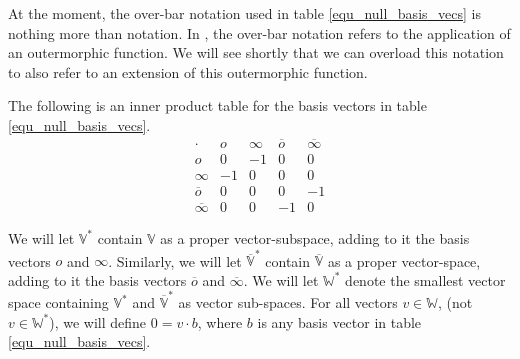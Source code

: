 \documentclass{birkjour}
\theoremstyle{definition}
\theoremstyle{remark}
\numberwithin{equation}{section}
\newcommand{\V}{\mathbb{V}}
\newcommand{\W}{\mathbb{W}}
\newcommand{\nvao}{o}
\newcommand{\nvai}{\infty}
\newcommand{\nvaob}{\overline{o}}
\newcommand{\nvaib}{\overline{\infty}}
\begin{document}
At the moment, the over-bar notation used in table \eqref{equ_null_basis_vecs}
is nothing more than notation.  In \cite{Parkin12}, the over-bar notation refers to the application
of an outermorphic function.  We will see shortly that we can overload this notation to
also refer to an extension of this outermorphic function.

The following is an inner product table for the basis vectors in table \eqref{equ_null_basis_vecs}.
\begin{equation}
\begin{array}{c|cccc}
\cdot & \nvao & \nvai & \nvaob & \nvaib \\
\hline
\nvao & 0 & -1 & 0 & 0 \\
\nvai & -1 & 0 & 0 & 0 \\
\nvaob & 0 & 0 & 0 & -1 \\
\nvaib & 0 & 0 & -1 & 0
\end{array}
\end{equation}

We will let $\V^*$ contain $\V$ as a proper vector-subspace, adding to it the
basis vectors $\nvao$ and $\nvai$.  Similarly, we will let $\overline{\V}^*$ contain
$\overline{\V}$ as a proper vector-space, adding to it the basis vectors $\overline{\nvao}$
and $\overline{\nvai}$.  We will let $\W^*$ denote the smallest vector space containing
$\V^*$ and $\overline{\V}^*$ as vector sub-spaces.
For all vectors $v\in\W$, (not $v\in\W^*$), we will define $0=v\cdot b$, where
$b$ is any basis vector in table \eqref{equ_null_basis_vecs}.
\end{document}
